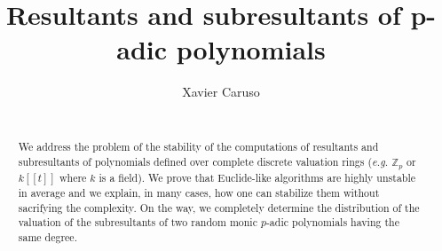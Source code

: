 \documentclass{sig-alternate}
\DeclareMathOperator{\val}{val}
\begin{document}
\newtheorem{theo}{Theorem}[section]
\newtheorem{lem}[theo]{Lemma}
\newtheorem{prop}[theo]{Proposition}
\newtheorem{cor}[theo]{Corollary}
\newtheorem{quest}[theo]{Question}
\newtheorem{rem}[theo]{Remark}
\newtheorem{ex}[theo]{Example}
\newtheorem{deftn}[theo]{Definition}
\newtheorem{rmk}[theo]{Remark}

\newcommand{\N}{\mathbb N}
\newcommand{\Z}{\mathbb Z}
\newcommand{\Zp}{\Z_p}
\newcommand{\Q}{\mathbb Q}
\newcommand{\Qp}{\Q_p}
\newcommand{\F}{\mathbb F}
\newcommand{\Fp}{\F_p}
\newcommand{\R}{\mathbb R}
\renewcommand{\O}{\mathcal O}
\newcommand{\m}{\mathfrak m}

\newcommand{\M}{\text{\tt M}}

\newcommand{\ring}{\mathfrak A}
\newcommand{\fracring}{\mathfrak K}
\renewcommand{\prec}{\text{\rm prec}}
\renewcommand{\val}{\text{\rm val}}
\newcommand{\id}{\text{\rm id}}
\newcommand{\Res}{\text{\rm Res}}
\newcommand{\lc}{\text{\rm lc}}
\newcommand{\Card}{\text{\rm Card}\:}

\renewcommand{\P}{\mathbb P}
\newcommand{\E}{\mathbb E}
\newcommand{\Var}{\text{\rm Var}}
\newcommand{\Cov}{\text{\rm Cov}}


\newcommand{\lb}{\ensuremath{\llbracket}}
\newcommand{\rb}{\ensuremath{\rrbracket}}
\newcommand{\lp}{(\!(}
\newcommand{\rp}{)\!)}
\newcommand{\col}{\: : \:}

\newcommand{\A}{W}

\def\todo#1{\ \!\!{\color{red} #1}}
\def\todofor#1#2{\ \!\!{\color{purple} {\bf #1}: #2}}

\def\binom#1#2{\Big(\begin{array}{cc} #1 \\ #2 \end{array}\Big)}

\title{Resultants and subresultants of p-adic polynomials}

\author{
\alignauthor Xavier Caruso\\
  \\
}

\maketitle

\begin{abstract}
We address the problem of the stability of the computations of resultants 
and subresultants of polynomials defined over complete discrete valuation 
rings (\emph{e.g.} $\Zp$ or $k[[t]]$ where $k$ is a field). We prove that 
Euclide-like algorithms are highly unstable in average and we explain, in
many cases, how one can stabilize them without sacrifying the complexity.
On the way, we completely determine the distribution of the valuation of
the subresultants of two random monic $p$-adic polynomials having the
same degree.
\end{abstract}
\end{document}
